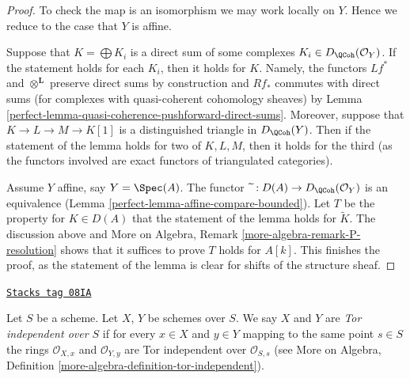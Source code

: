 \begin{proof}

To check the map is an isomorphism we may work locally on $Y$.
Hence we reduce to the case that $Y$ is affine.

\medskip\noindent
Suppose that $K = \bigoplus K_i$ is a direct
sum of some complexes $K_i \in D_\QCoh(\mathcal{O}_Y)$.
If the statement holds for each $K_i$, then it holds for $K$.
Namely, the functors $Lf^*$ and $\otimes^\mathbf{L}$ preserve
direct sums by construction and $Rf_*$ commutes with direct sums
(for complexes with quasi-coherent cohomology sheaves) by
Lemma \ref{perfect-lemma-quasi-coherence-pushforward-direct-sums}.
Moreover, suppose that $K \to L \to M \to K[1]$ is a distinguished
triangle in $D_\QCoh(Y)$. Then if the statement of the
lemma holds for two of $K, L, M$, then it holds for the third
(as the functors involved are exact functors of triangulated categories).

\medskip\noindent
Assume $Y$ affine, say $Y = \Spec(A)$. The functor
$\widetilde{\ } : D(A) \to D_\QCoh(\mathcal{O}_Y)$ is an equivalence
(Lemma \ref{perfect-lemma-affine-compare-bounded}).
Let $T$ be the property for $K \in D(A)$ that
the statement of the lemma holds for $\widetilde{K}$.
The discussion above and
More on Algebra, Remark \ref{more-algebra-remark-P-resolution}
shows that it suffices to prove $T$ holds for $A[k]$.
This finishes the proof, as the statement of the lemma
is clear for shifts of the structure sheaf.
\end{proof}

\begin{definition}
\label{perfect-definition-tor-independent}
\href{https://stacks.math.columbia.edu/tag/08IA}{\texttt{Stacks tag 08IA}}

Let $S$ be a scheme. Let $X$, $Y$ be schemes over $S$. We say $X$ and
$Y$ are {\it Tor independent over $S$} if for every $x \in X$ and
$y \in Y$ mapping to the same point $s \in S$ the rings
$\mathcal{O}_{X, x}$ and $\mathcal{O}_{Y, y}$ are Tor independent
over $\mathcal{O}_{S, s}$ (see
More on Algebra, Definition \ref{more-algebra-definition-tor-independent}).
\end{definition}

